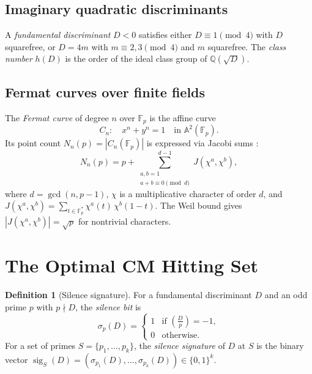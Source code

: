 \documentclass[11pt]{amsart}
\theoremstyle{definition}
\newtheorem{definition}[theorem]{Definition}
\begin{document}
\subsection{Imaginary quadratic discriminants}

A \emph{fundamental discriminant} $D < 0$ satisfies either $D \equiv 1 \pmod{4}$ with $D$ squarefree, or $D = 4m$ with $m \equiv 2, 3 \pmod{4}$ and $m$ squarefree. The \emph{class number} $h(D)$ is the order of the ideal class group of $\mathbb{Q}(\sqrt{D})$.

\subsection{Fermat curves over finite fields}

The \emph{Fermat curve} of degree $n$ over $\mathbb{F}_p$ is the affine curve
\[
C_n: \quad x^n + y^n = 1 \quad \text{in } \mathbb{A}^2(\mathbb{F}_p).
\]
Its point count $N_n(p) = |C_n(\mathbb{F}_p)|$ is expressed via Jacobi sums \cite{weil1949,ireland1990}:
\begin{equation}\label{eq:jacobi-count}
N_n(p) = p + \sum_{\substack{a, b = 1 \\ a + b \equiv 0 \!\!\!\pmod{d}}}^{d-1} J(\chi^a, \chi^b),
\end{equation}
where $d = \gcd(n, p-1)$, $\chi$ is a multiplicative character of order $d$, and $J(\chi^a, \chi^b) = \sum_{t \in \mathbb{F}_p^*} \chi^a(t)\,\chi^b(1-t)$. The Weil bound gives $|J(\chi^a, \chi^b)| = \sqrt{p}$ for nontrivial characters.


\section{The Optimal CM Hitting Set}
\label{sec:hitting}

\begin{definition}[Silence signature]\label{def:silence}
For a fundamental discriminant $D$ and an odd prime $p$ with $p \nmid D$, the \emph{silence bit} is
\[
\sigma_p(D) = \begin{cases} 1 & \text{if } \left(\frac{D}{p}\right) = -1, \\ 0 & \text{otherwise.} \end{cases}
\]
For a set of primes $S = \{p_1, \ldots, p_k\}$, the \emph{silence signature} of $D$ at $S$ is the binary vector $\operatorname{sig}_S(D) = (\sigma_{p_1}(D), \ldots, \sigma_{p_k}(D)) \in \{0,1\}^k$.
\end{definition}
\end{document}
